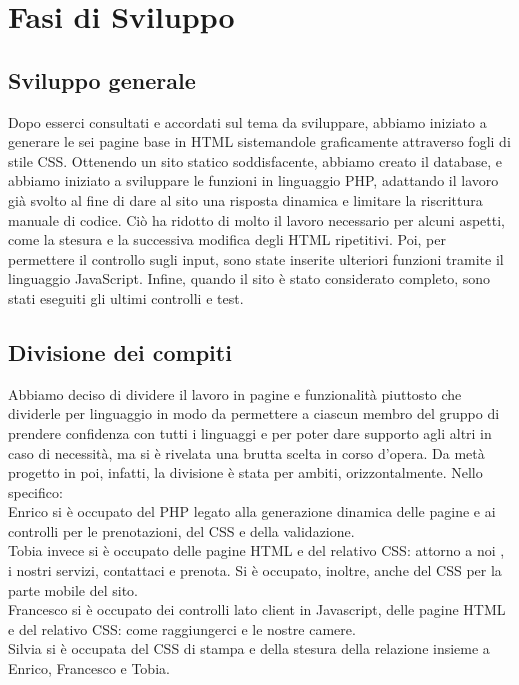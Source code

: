 \section{Fasi di Sviluppo}
\subsection{Sviluppo generale}
Dopo esserci consultati e accordati sul tema da sviluppare, abbiamo iniziato a generare le sei pagine base in HTML sistemandole graficamente attraverso fogli di stile CSS. Ottenendo un sito statico soddisfacente, abbiamo creato il database, e abbiamo iniziato a sviluppare le funzioni in linguaggio PHP, adattando il lavoro già svolto al fine di dare al sito una risposta dinamica e limitare la riscrittura manuale di codice. Ciò ha ridotto di molto il lavoro necessario per alcuni aspetti, come la stesura e la successiva modifica degli HTML ripetitivi. Poi, per permettere il controllo sugli input, sono state inserite ulteriori funzioni tramite il linguaggio JavaScript. Infine, quando il sito è stato considerato completo, sono stati eseguiti gli ultimi controlli e test.
\subsection{Divisione dei compiti}
Abbiamo deciso di dividere il lavoro in pagine e funzionalità piuttosto che dividerle per linguaggio in modo da permettere a ciascun membro del gruppo di prendere confidenza con tutti i linguaggi e per poter dare supporto agli altri in caso di necessità, ma si è rivelata una brutta scelta in corso d’opera. Da metà progetto in poi, infatti, la divisione è stata per ambiti, orizzontalmente. 
Nello specifico:\\

Enrico si è occupato del PHP legato alla generazione dinamica delle pagine e ai controlli per le prenotazioni, del CSS e della validazione.\\

Tobia invece si è occupato delle pagine HTML e del relativo CSS: attorno a noi , i nostri servizi, contattaci e prenota. Si è occupato, inoltre, anche del CSS per la parte mobile del sito.\\

Francesco si è occupato dei controlli lato client in Javascript, delle pagine HTML e del relativo CSS: come raggiungerci e le nostre camere.\\

Silvia si è occupata del CSS di stampa e della stesura della relazione insieme a Enrico, Francesco e Tobia. 